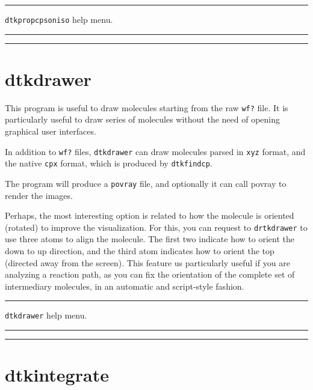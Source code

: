\rule{\textwidth}{1pt}
{\center\texttt{dtkpropcpsoniso} help menu.\\}
\rule{\textwidth}{1pt}
\begin{footnotesize}
\end{footnotesize}
\rule{\textwidth}{1pt}

\section{\label{sec:dtkdrawer}dtkdrawer}

This program is useful to draw molecules starting from the raw \texttt{wf?} file.
It is particularly useful to draw series of molecules without the need of opening
graphical user interfaces.

In addition to \texttt{wf?} files, \texttt{dtkdrawer} can draw molecules parsed in
\texttt{xyz} format, and the native \texttt{cpx} format, which is produced by
\texttt{dtkfindcp}.

The program will produce a \texttt{povray} file, and optionally it can call povray to
render the images.

Perhaps, the most interesting option is related to how the molecule is oriented (rotated)
to improve the visualization. For this, you can request to \texttt{drtkdrawer} to use
three atoms to align the molecule. The first two indicate how to orient the down to up
direction, and the third atom indicates how to orient the top (directed away from the screen).
This feature us particularly useful if you are analyzing a reaction path, as you can fix
the orientation of the complete set of intermediary molecules, in an automatic and
script-style fashion.

\rule{\textwidth}{1pt}
{\center\texttt{dtkdrawer} help menu.\\}
\rule{\textwidth}{1pt}
\begin{footnotesize}
\end{footnotesize}
\rule{\textwidth}{1pt}

\section{\label{sec:dtkintegrate}dtkintegrate}

